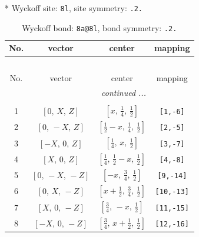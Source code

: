 \documentclass[fleqn,8pt]{jsarticle}
\begin{document}
* Wyckoff site: {\tt 8l}, site symmetry: {\tt .2.}
\renewcommand{\arraystretch}{1.2}
\begin{longtable}{cccc}
\caption{Wyckoff bond: {\tt 8a@8l}, bond symmetry: {\tt .2.}}
 \\
 \hline \hline
No. & vector & center & mapping \\ \hline \endfirsthead

\multicolumn{3}{l}{\tablename\ \thetable{}} \\
 \hline \hline
No. & vector & center & mapping \\ \hline \endhead

 \hline \hline
\multicolumn{3}{r}{\footnotesize\it continued ...} \\ \endfoot

 \hline \hline
\multicolumn{3}{r}{} \\ \endlastfoot

1 & $\left[ 0,\, X,\, Z \right]$ & $\left[ x,\, \frac{1}{4},\, \frac{1}{2} \right]$ & {\tt [1,-6]} \\ \hline
2 & $\left[ 0,\, - X,\, Z \right]$ & $\left[ \frac{1}{2} - x,\, \frac{1}{4},\, \frac{1}{2} \right]$ & {\tt [2,-5]} \\ \hline
3 & $\left[ - X,\, 0,\, Z \right]$ & $\left[ \frac{1}{4},\, x,\, \frac{1}{2} \right]$ & {\tt [3,-7]} \\ \hline
4 & $\left[ X,\, 0,\, Z \right]$ & $\left[ \frac{1}{4},\, \frac{1}{2} - x,\, \frac{1}{2} \right]$ & {\tt [4,-8]} \\ \hline
5 & $\left[ 0,\, - X,\, - Z \right]$ & $\left[ - x,\, \frac{3}{4},\, \frac{1}{2} \right]$ & {\tt [9,-14]} \\ \hline
6 & $\left[ 0,\, X,\, - Z \right]$ & $\left[ x + \frac{1}{2},\, \frac{3}{4},\, \frac{1}{2} \right]$ & {\tt [10,-13]} \\ \hline
7 & $\left[ X,\, 0,\, - Z \right]$ & $\left[ \frac{3}{4},\, - x,\, \frac{1}{2} \right]$ & {\tt [11,-15]} \\ \hline
8 & $\left[ - X,\, 0,\, - Z \right]$ & $\left[ \frac{3}{4},\, x + \frac{1}{2},\, \frac{1}{2} \right]$ & {\tt [12,-16]} \\
\end{longtable}
\renewcommand{\arraystretch}{1.2}
\end{document}
